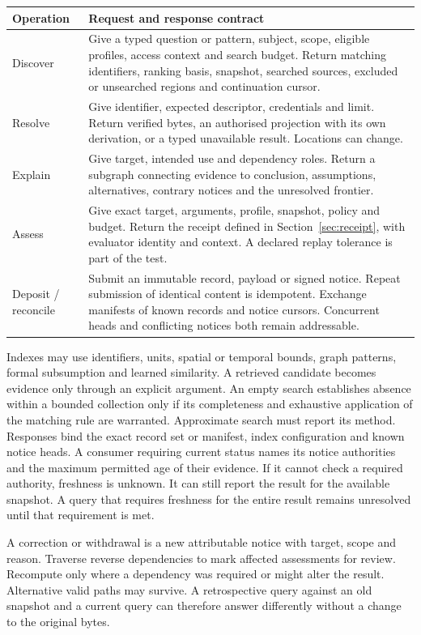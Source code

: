 \documentclass[11pt,a4paper]{article}
\newcommand{\topic}[1]{\par\smallskip{\sffamily\bfseries\color{ink}#1\par}\nobreak}
\begin{document}
\small
\begin{tabularx}{\linewidth}{@{}L{.19\linewidth}Y@{}}
\toprule
\textbf{Operation} & \textbf{Request and response contract} \\ \midrule
Discover & Give a typed question or pattern, subject, scope, eligible profiles, access context and search budget. Return matching identifiers, ranking basis, snapshot, searched sources, excluded or unsearched regions and continuation cursor. \\
Resolve & Give identifier, expected descriptor, credentials and limit. Return verified bytes, an authorised projection with its own derivation, or a typed unavailable result. Locations can change. \\
Explain & Give target, intended use and dependency roles. Return a subgraph connecting evidence to conclusion, assumptions, alternatives, contrary notices and the unresolved frontier. \\
Assess & Give exact target, arguments, profile, snapshot, policy and budget. Return the receipt defined in Section~\ref{sec:receipt}, with evaluator identity and context. A declared replay tolerance is part of the test. \\
Deposit / reconcile & Submit an immutable record, payload or signed notice. Repeat submission of identical content is idempotent. Exchange manifests of known records and notice cursors. Concurrent heads and conflicting notices both remain addressable. \\
\bottomrule
\end{tabularx}
\normalsize

\topic{Retrieval and change}
Indexes may use identifiers, units, spatial or temporal bounds, graph patterns, formal subsumption and learned similarity. A retrieved candidate becomes evidence only through an explicit argument. An empty search establishes absence within a bounded collection only if its completeness and exhaustive application of the matching rule are warranted. Approximate search must report its method. Responses bind the exact record set or manifest, index configuration and known notice heads. A consumer requiring current status names its notice authorities and the maximum permitted age of their evidence. If it cannot check a required authority, freshness is unknown. It can still report the result for the available snapshot. A query that requires freshness for the entire result remains unresolved until that requirement is met.

A correction or withdrawal is a new attributable notice with target, scope and reason. Traverse reverse dependencies to mark affected assessments for review. Recompute only where a dependency was required or might alter the result. Alternative valid paths may survive. A retrospective query against an old snapshot and a current query can therefore answer differently without a change to the original bytes.
\end{document}
